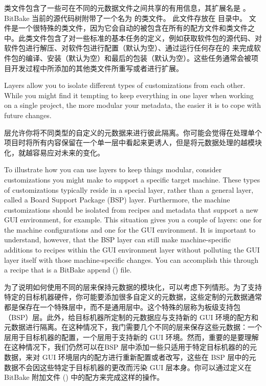 类文件包含了一些可在不同的元数据文件之间共享的有用信息，其扩展名是 。 BitBake 当前的源代码树附带了一个名为  的类文件。 此文件存放在  目录中。 文件是一个很特殊的类文件，因为它会自动的被包含在所有的配方文件和类文件之中。此类文件包含了对一些标准的基本任务的定义，例如获取软件包的源代码、对软件包进行解压、对软件包进行配置（默认为空）、通过运行任何存在的  来完成软件包的编译、安装（默认为空）和最后的包装（默认为空）。这些任务通常会被项目开发过程中所添加的其他类文件所重写或者进行扩展。

\label{section:Layers}
Layers allow you to isolate different types of customizations from each other. While you might find it tempting to keep everything in one layer when working on a single project, the more modular your metadata, the easier it is to cope with future changes.

层允许你将不同类型的自定义的元数据来进行彼此隔离。你可能会觉得在处理单个项目时将所有内容保留在一个单一层中看起来更诱人，但是将元数据处理的越模块化，就越容易应对未来的变化。

To illustrate how you can use layers to keep things modular, consider customizations you might make to support a specific target machine. These types of customizations typically reside in a special layer, rather than a general layer, called a Board Support Package (BSP) layer. Furthermore, the machine customizations should be isolated from recipes and metadata that support a new GUI environment, for example. This situation gives you a couple of layers: one for the machine configurations and one for the GUI environment. It is important to understand, however, that the BSP layer can still make machine-specific additions to recipes within the GUI environment layer without polluting the GUI layer itself with those machine-specific changes. You can accomplish this through a recipe that is a BitBake append () file.

为了说明如何使用不同的层来保持元数据的模块化，可以考虑下列情形。为了支持特定的目标机器硬件，你可能要添加很多自定义的元数据，这些定制的元数据通常都是保存在一个特殊层中，而不是通用层中。这个特殊的层称为板级支持包（BSP）层。此外，给目标机器所定制的元数据应与支持新的 GUI 环境的配方和元数据进行隔离。在这种情况下，我门需要几个不同的层来保存这些元数据：一个层用于目标机器的配置，一个层用于支持新的 GUI 环境。然而，重要的是要理解在这种情况下，我们仍然可以在BSP 层中添加一些只适用于特定目标机器的的元数据，来对 GUI 环境层内的配方进行重新配置或者改写，这些在 BSP 层中的元数据不会因这些特定于目标机器的更改而污染 GUI 层本身。你可以通过定义在 BitBake 附加文件 () 中的配方来完成这样的操作。

